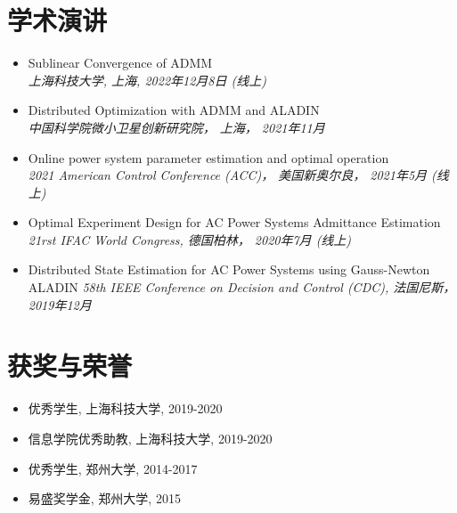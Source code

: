 \documentclass[paper=a4,fontsize=11pt]{scrartcl} %
\newcommand{\NewPart}[1]{\section*{\uppercase{#1}}}
\begin{document}
\begin{CJK*}{UTF8}{gbsn}
\NewPart{学术演讲}{}
\begin{itemize}
	
	\item {
		{Sublinear Convergence of ADMM}\\
		\emph{上海科技大学, 上海, 2022年12月8日 (线上)	} }
	\item  {
		{Distributed Optimization with ADMM and ALADIN}\\
		\emph{中国科学院微小卫星创新研究院， 上海， 2021年11月
	} }
	
	
	\item  {
		{Online power system parameter estimation and optimal operation}\\
		\emph{2021 American Control Conference (ACC)， 美国新奥尔良， 2021年5月 (线上)
	} }
	
	\item  {
		Optimal Experiment Design for AC Power Systems Admittance Estimation\\
		\emph{21rst IFAC World Congress, 德国柏林， 2020年7月 (线上)
	} }
	
	\item  {
		Distributed State Estimation for AC Power Systems using Gauss-Newton ALADIN 
		\emph{58th IEEE Conference on Decision and Control (CDC),
			法国尼斯， 2019年12月} }
\end{itemize}


\NewPart{获奖与荣誉}
\begin{itemize}
	\item 优秀学生, 上海科技大学, 2019-2020
	
	\item 信息学院优秀助教, 上海科技大学, 2019-2020
		
	
	\item 优秀学生, 郑州大学, 2014-2017
	
	\item 易盛奖学金, 郑州大学, 2015
	

\end{itemize}
\end{CJK*}
\end{document}
